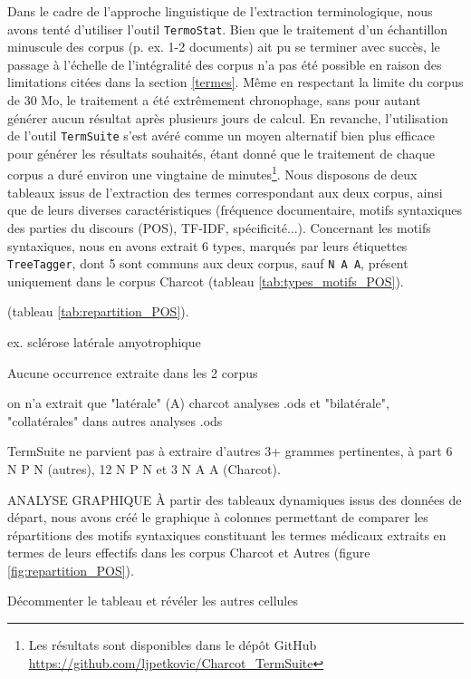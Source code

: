 Dans le cadre de l'approche linguistique de l'extraction terminologique, nous avons tenté d'utiliser l'outil \texttt{TermoStat}. Bien que le traitement d'un échantillon minuscule des corpus (p. ex. 1-2 documents) ait pu se terminer avec succès, le passage à l'échelle de l'intégralité des corpus n'a pas été possible en raison des limitations citées dans la section \ref{termes}. Même en respectant la limite du corpus de 30 Mo, le traitement a été extrêmement chronophage, sans pour autant générer aucun résultat après plusieurs jours de calcul. En revanche, l'utilisation de l'outil \texttt{TermSuite} s'est avéré comme un moyen alternatif bien plus efficace pour générer les résultats souhaités, étant donné que le traitement de chaque corpus a duré environ une vingtaine de minutes\footnote{Les résultats sont disponibles dans le dépôt GitHub \url{https://github.com/ljpetkovic/Charcot\_TermSuite}}. Nous disposons de deux tableaux issus de l'extraction des termes correspondant aux deux corpus, ainsi que de leurs diverses caractéristiques (fréquence documentaire, motifs syntaxiques des parties du discours (POS), \textsc{TF-IDF}, spécificité$\dots$). Concernant les motifs syntaxiques, nous en avons extrait 6 types, marqués par leurs étiquettes \texttt{TreeTagger}, dont 5 sont communs aux deux corpus, sauf \texttt{N A A}, présent uniquement dans le corpus \og{}Charcot\fg{} (tableau \ref{tab:types_motifs_POS}). 



(tableau \ref{tab:repartition_POS}).

ex. sclérose latérale amyotrophique

Aucune occurrence extraite dans les 2 corpus

on n'a extrait que "latérale" (A) charcot analyses .ods et "bilatérale", "collatérales" dans autres analyses .ods

TermSuite ne parvient pas à extraire d'autres 3+ grammes pertinentes, à part 6 N P N (autres), 12 N P N et 3 N A A (Charcot).

ANALYSE GRAPHIQUE
À partir des tableaux dynamiques issus des données de départ, nous avons créé le graphique à colonnes permettant de comparer les répartitions des motifs syntaxiques constituant les termes médicaux extraits en termes de leurs effectifs dans les corpus Charcot et Autres (figure \ref{fig:repartition_POS}).


Décommenter le tableau et révéler les autres cellules


